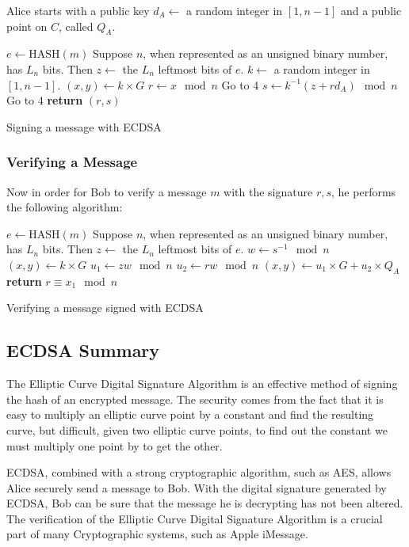 Alice starts with a public key $d_A \gets$ a random integer in $[1, n-1]$
and a public point on $C$, called $Q_A$.

\begin{algorithm}
    \begin{algorithmic}[1]
        \State $e \gets \text{HASH}(m)$
        \State Suppose $n$, when represented as an unsigned binary number, has $L_n$ bits.
        Then $z \gets$ the $L_n$ leftmost bits of $e$.
        \State $k \gets$ a random integer in $[1, n-1]$.
        \State $(x,y) \gets k \times G$
        \State $r \gets x \mod n$
        \State Go to 4
        \EndIf
        \State $s \gets k^{-1}(z + rd_A) \mod n$
        \State Go to 4
        \EndIf
        \State \textbf{return} $(r, s)$
        \EndProcedure
    \end{algorithmic}
    \caption{Signing a message with ECDSA}
\end{algorithm}

\subsubsection{Verifying a Message}

Now in order for Bob to verify a message $m$ with the signature $r,s$,
he performs the following algorithm:

\begin{algorithm}
    \begin{algorithmic}[1]
        \State $e \gets \text{HASH}(m)$
        \State Suppose $n$, when represented as an unsigned binary number, has $L_n$ bits.
        Then $z \gets$ the $L_n$ leftmost bits of $e$.
        \State $w \gets s^{-1} \mod n$
        \State $(x,y) \gets k \times G$
        \State $u_1 \gets zw \mod n$
        \State $u_2 \gets rw \mod n$
        \State $(x,y) \gets u_1 \times G + u_2 \times Q_A$
        \State \textbf{return} $r \equiv x_1 \mod n$
        \EndProcedure
    \end{algorithmic}
    \caption{Verifying a message signed with ECDSA}
\end{algorithm}

\subsection{ECDSA Summary}

The Elliptic Curve Digital Signature Algorithm is an effective method of signing the
hash of an encrypted message.  The security comes from the fact that
it is easy to multiply an elliptic curve point by a constant and find
the resulting curve, but difficult, given two elliptic curve points,
to find out the constant we must multiply one point by to get the other.

ECDSA, combined with a strong cryptographic algorithm, such as AES, allows Alice
securely send a message to Bob.  With the digital signature generated by ECDSA,
Bob can be sure that the message he is decrypting has not been altered. The
verification of the Elliptic Curve Digital Signature
Algorithm is a crucial part of many Cryptographic
systems, such as Apple iMessage.
